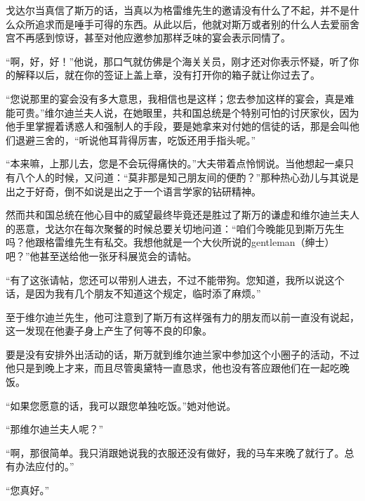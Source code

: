 \par 戈达尔当真信了斯万的话，当真以为格雷维先生的邀请没有什么了不起，并不是什么众所追求而是唾手可得的东西。从此以后，他就对斯万或者别的什么人去爱丽舍宫不再感到惊讶，甚至对他应邀参加那样乏味的宴会表示同情了。
\par “啊，好，好！”他说，那口气就仿佛是个海关关员，刚才还对你表示怀疑，听了你的解释以后，就在你的签证上盖上章，没有打开你的箱子就让你过去了。
\par “您说那里的宴会没有多大意思，我相信也是这样；您去参加这样的宴会，真是难能可贵。”维尔迪兰夫人说，在她眼里，共和国总统是个特别可怕的讨厌家伙，因为他手里掌握着诱惑人和强制人的手段，要是她拿来对付她的信徒的话，那是会叫他们退避三舍的，“听说他耳背得厉害，吃饭还用手指头呢。”
\par “本来嘛，上那儿去，您是不会玩得痛快的。”大夫带着点怜悯说。当他想起一桌只有八个人的时候，又问道：“莫非那是知己朋友间的便酌？”那种热心劲儿与其说是出之于好奇，倒不如说是出之于一个语言学家的钻研精神。
\par 然而共和国总统在他心目中的威望最终毕竟还是胜过了斯万的谦虚和维尔迪兰夫人的恶意，戈达尔在每次聚餐的时候总要关切地问道：“咱们今晚能见到斯万先生吗？他跟格雷维先生有私交。我想他就是一个大伙所说的gentleman（绅士）吧？”他甚至送给他一张牙科展览会的请帖。
\par “有了这张请帖，您还可以带别人进去，不过不能带狗。您知道，我所以说这个话，是因为我有几个朋友不知道这个规定，临时添了麻烦。”
\par 至于维尔迪兰先生，他可注意到了斯万有这样强有力的朋友而以前一直没有说起，这一发现在他妻子身上产生了何等不良的印象。
\par 要是没有安排外出活动的话，斯万就到维尔迪兰家中参加这个小圈子的活动，不过他只是到晚上才来，而且尽管奥黛特一直恳求，他也没有答应跟他们在一起吃晚饭。
\par “如果您愿意的话，我可以跟您单独吃饭。”她对他说。
\par “那维尔迪兰夫人呢？”
\par “啊，那很简单。我只消跟她说我的衣服还没有做好，我的马车来晚了就行了。总有办法应付的。”
\par “您真好。”
